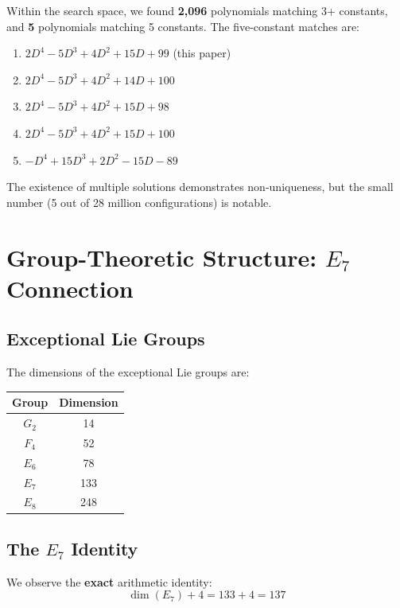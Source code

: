\documentclass[11pt,a4paper]{article}
\begin{document}
Within the search space, we found \textbf{2,096} polynomials matching 3+ constants, and \textbf{5} polynomials matching 5 constants. The five-constant matches are:

\begin{enumerate}
    \item $2D^4 - 5D^3 + 4D^2 + 15D + 99$ (this paper)
    \item $2D^4 - 5D^3 + 4D^2 + 14D + 100$
    \item $2D^4 - 5D^3 + 4D^2 + 15D + 98$
    \item $2D^4 - 5D^3 + 4D^2 + 15D + 100$
    \item $-D^4 + 15D^3 + 2D^2 - 15D - 89$
\end{enumerate}

The existence of multiple solutions demonstrates non-uniqueness, but the small number (5 out of 28 million configurations) is notable.

\section{Group-Theoretic Structure: $E_7$ Connection}

\subsection{Exceptional Lie Groups}

The dimensions of the exceptional Lie groups are:

\begin{center}
\begin{tabular}{cc}
\hline
Group & Dimension \\
\hline
$G_2$ & 14 \\
$F_4$ & 52 \\
$E_6$ & 78 \\
$E_7$ & 133 \\
$E_8$ & 248 \\
\hline
\end{tabular}
\end{center}

\subsection{The $E_7$ Identity}

We observe the \textbf{exact} arithmetic identity:
\begin{equation}
\boxed{\dim(E_7) + 4 = 133 + 4 = 137}
\end{equation}
\end{document}
